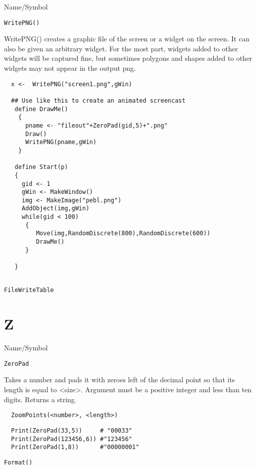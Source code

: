 \rl



\begin{desc}{Name/Symbol}
\item[Name/Symbol]	\verb+WritePNG()+

\item[Description] WritePNG() creates a graphic file of the screen or
  a widget on the screen.  It can also be given an arbitrary widget.
  For the most part, widgets added to other widgets will be captured
  fine, but sometimes polygons and shapes added to other widgets may
  not appear in the output png.

\item[Usage]

\begin{verbatim}
  x <-  WritePNG("screen1.png",gWin)

  ## Use like this to create an animated screencast
   define DrawMe()
    {
      pname <- "fileout"+ZeroPad(gid,5)+".png"
      Draw()
      WritePNG(pname,gWin)
    }
  
   define Start(p)  
   {
     gid <- 1
     gWin <- MakeWindow()
     img <- MakeImage("pebl.png")
     AddObject(img,gWin)
     while(gid < 100)
      {
         Move(img,RandomDiscrete(800),RandomDiscrete(600))
         DrawMe()
      }

   }   
  
\end{verbatim}

\item[See Also]	\verb+FileWriteTable+

\end{desc}

\rl


\section{Z}
\rl

\begin{desc}{Name/Symbol}
\item[Name/Symbol]	\verb+ZeroPad+

\item[Description]  Takes a number and pads it with zeroes left of the
  decimal point so that its length is equal to <size>. Argument must
  be a positive integer and less than ten digits.  Returns a string.


\item[Usage]
\begin{verbatim}
  ZoomPoints(<number>, <length>)
\end{verbatim}

\item[Example] 
\begin{verbatim}
  Print(ZeroPad(33,5))     # "00033"
  Print(ZeroPad(123456,6)) #"123456"
  Print(ZeroPad(1,8))      #"00000001"
\end{verbatim}

\item[See Also] \verb+Format()+
\end{desc}




